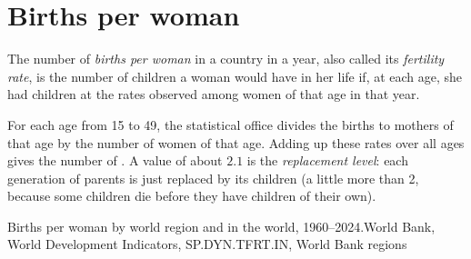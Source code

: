 \section{Births per woman}

\begin{definition}\label{def:g6:health-and-population:births-per-woman}
The number of \emph{births per woman}
in a country in a year, also called its \emph{fertility rate}, is the number
of children a woman would have in her life if, at each age, she had children
at the rates observed among women of that age in that year.
\end{definition}

\begin{measure}
For each age from 15 to 49, the statistical office divides the births to
mothers of that age by the number of women of that age. Adding up these rates
over all ages gives the number of . A value of about $2.1$ is
the \emph{replacement level}: each generation of parents is just replaced by its
children (a little more than 2, because some children die before they have
children of their own).
\end{measure}

\begin{omchart}{Births per woman by world region and in the world, 1960--2024.}{World
Bank, World Development Indicators, SP.DYN.TFRT.IN, World Bank regions}
\end{omchart}

